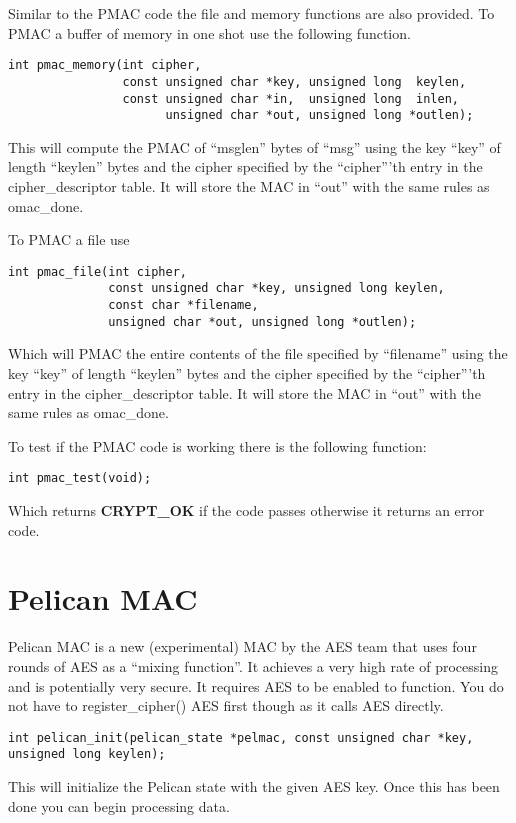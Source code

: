 \documentclass[a4paper]{book}
\begin{document}
Similar to the PMAC code the file and memory functions are also provided.  To PMAC a buffer of memory in one shot use the 
following function.

\begin{verbatim}
int pmac_memory(int cipher, 
                const unsigned char *key, unsigned long  keylen,
                const unsigned char *in,  unsigned long  inlen,
                      unsigned char *out, unsigned long *outlen);
\end{verbatim}
This will compute the PMAC of ``msglen'' bytes of ``msg'' using the key ``key'' of length ``keylen'' bytes and the cipher
specified by the ``cipher'''th entry in the cipher\_descriptor table.  It will store the MAC in ``out'' with the same
rules as omac\_done.

To PMAC a file use
\begin{verbatim}
int pmac_file(int cipher, 
              const unsigned char *key, unsigned long keylen,
              const char *filename, 
              unsigned char *out, unsigned long *outlen);
\end{verbatim}

Which will PMAC the entire contents of the file specified by ``filename'' using the key ``key'' of length ``keylen'' bytes
and the cipher specified by the ``cipher'''th entry in the cipher\_descriptor table.  It will store the MAC in ``out'' with 
the same rules as omac\_done.

To test if the PMAC code is working there is the following function:
\begin{verbatim}
int pmac_test(void);
\end{verbatim}
Which returns {\bf CRYPT\_OK} if the code passes otherwise it returns an error code.

\section{Pelican MAC}
Pelican MAC is a new (experimental) MAC by the AES team that uses four rounds of AES as a ``mixing function''.  It achieves a very high 
rate of processing and is potentially very secure.  It requires AES to be enabled to function.  You do not have to register\_cipher() AES first though
as it calls AES directly.

\begin{verbatim}
int pelican_init(pelican_state *pelmac, const unsigned char *key, unsigned long keylen);
\end{verbatim}
This will initialize the Pelican state with the given AES key.  Once this has been done you can begin processing data.
\end{document}
